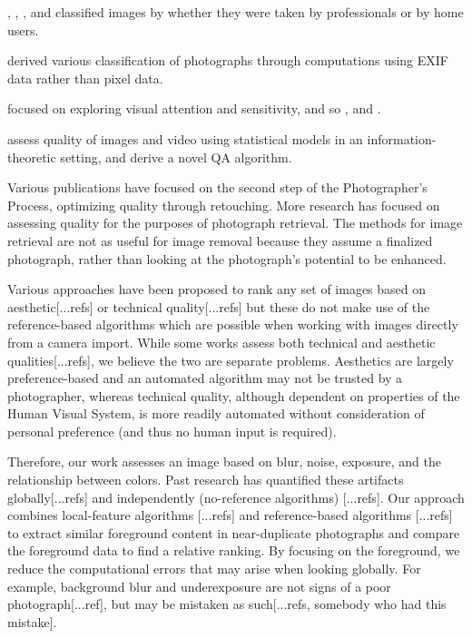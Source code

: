 \documentclass[twocolumn]{article}
\begin{document}
\cite{springerlink:10.1007/978-3-540-30541-5_25}, \cite{springerlink:10.1007/11744078_23}, \cite{1640788}, and \cite{springerlink:10.1007/978-3-540-88690-7_29} classified images by whether they were taken by professionals or by home users.

\cite{1315222} derived various classification of photographs through computations using EXIF data rather than pixel data.

\cite{1518955} focused on exploring  visual attention and sensitivity, and so \cite{Sun:2009:PAB:1631272.1631351} , and \cite{Pimenov_fastimage}.

\cite{1532311} assess quality of images and video using statistical models in an information-theoretic setting, and derive a novel QA algorithm.

Various publications have focused on the second step of the Photographer's Process, optimizing quality through retouching\cite{Bhattacahrya:2010:FPA:1873951.1873990}\cite{Kopf:2008:DPM:1409060.1409069}. More research has focused on assessing quality for the purposes of photograph retrieval\cite{Yeh:2010:PPR:1873951.1873963}\cite{vanZwol:2010:FEI:1772690.1772788}\cite{springerlink:10.1007/978-3-642-17187-1_57}\cite{Cui:2008:RTG:1459359.1459471}\cite{Chu2010256}. The methods for image retrieval are not as useful for image removal because they assume a finalized photograph, rather than looking at the photograph's potential to be enhanced.

Various approaches have been proposed to rank any set of images based on aesthetic[...refs] or technical quality[...refs] but these do not make use of the reference-based algorithms which are possible when working with images directly from a camera import. While some works assess both technical and aesthetic qualities[...refs], we believe the two are separate problems. Aesthetics are largely preference-based and an automated algorithm may not be trusted by a photographer, whereas technical quality, although dependent on properties of the Human Visual System, is more readily automated without consideration of personal preference (and thus no human input is required).

Therefore, our work assesses an image based on blur, noise, exposure, and the relationship between colors. Past research has quantified these artifacts globally[...refs] and independently (no-reference algorithms) [...refs]. Our approach combines local-feature algorithms [...refs] and reference-based algorithms [...refs] to extract similar foreground content in near-duplicate photographs and compare the foreground data to find a relative ranking. By focusing on the foreground, we reduce the computational errors that may arise when looking globally. For example, background blur and underexposure are not signs of a poor photograph[...ref], but may be mistaken as such[...refs, somebody who had this mistake].
\end{document}
